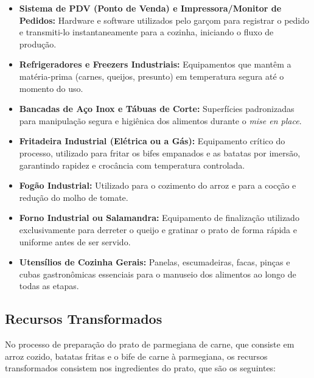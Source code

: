 \documentclass[12pt, a4paper]{article}
\begin{document}
\begin{itemize}
    \item \textbf{Sistema de PDV (Ponto de Venda) e Impressora/Monitor de Pedidos:} Hardware e software utilizados pelo garçom para registrar o pedido e transmiti-lo instantaneamente para a cozinha, iniciando o fluxo de produção.
    \item \textbf{Refrigeradores e Freezers Industriais:} Equipamentos que mantêm a matéria-prima (carnes, queijos, presunto) em temperatura segura até o momento do uso.
    \item \textbf{Bancadas de Aço Inox e Tábuas de Corte:} Superfícies padronizadas para manipulação segura e higiênica dos alimentos durante o \textit{mise en place}.
    \item \textbf{Fritadeira Industrial (Elétrica ou a Gás):} Equipamento crítico do processo, utilizado para fritar os bifes empanados e as batatas por imersão, garantindo rapidez e crocância com temperatura controlada.
    \item \textbf{Fogão Industrial:} Utilizado para o cozimento do arroz e para a cocção e redução do molho de tomate.
    \item \textbf{Forno Industrial ou Salamandra:} Equipamento de finalização utilizado exclusivamente para derreter o queijo e gratinar o prato de forma rápida e uniforme antes de ser servido.
    \item \textbf{Utensílios de Cozinha Gerais:} Panelas, escumadeiras, facas, pinças e cubas gastronômicas essenciais para o manuseio dos alimentos ao longo de todas as etapas.
\end{itemize}

\subsection{Recursos Transformados}
No processo de preparação do prato de parmegiana de carne, que consiste em arroz cozido, batatas fritas e o bife de carne à parmegiana, os recursos transformados consistem nos ingredientes do prato, que são os seguintes:
\end{document}
